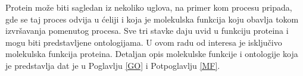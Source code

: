 Protein može biti sagledan iz nekoliko uglova, na primer kom procesu pripada,
gde se taj proces odvija u ćeliji i koja je molekulska funkcija koju obavlja
tokom izvršavanja pomenutog procesa. Sve tri stavke daju uvid u funkciju
proteina i mogu biti predstavljene ontologijama. U ovom radu od interesa je
isključivo molekulska funkcija proteina.  Detaljan opis  molekulske funkcije i
ontologije koja je predstavlja dat je u Poglavlju \ref{GO} i Potpoglavlju
\ref{MF}.








%
%   
%
%
%



%
%
